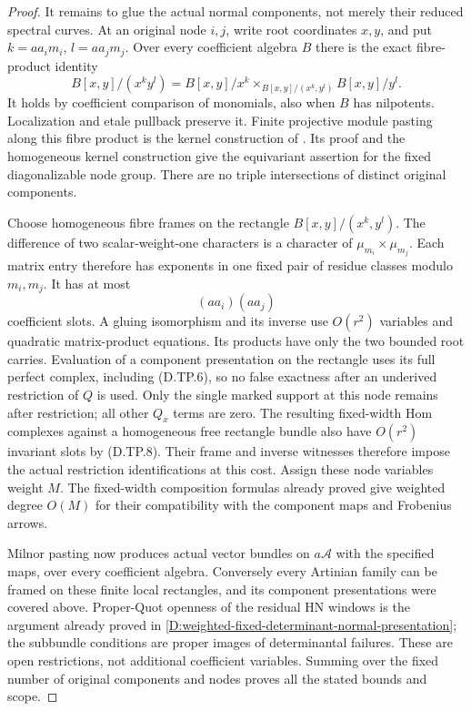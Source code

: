 \begin{proof}
It remains to glue the actual normal components,
not merely their reduced spectral curves.
At an original node $i,j$, write root coordinates
$x,y$, and put $k=aa_i m_i$, $l=aa_jm_j$.
Over every coefficient algebra $B$ there is
the exact fibre-product identity
\[
 B[x,y]/(x^ky^l)=B[x,y]/x^k
       \mathbin{\times}_{B[x,y]/(x^k,y^l)}B[x,y]/y^l.
                                                        \tag{D.TP.7}
\]
It holds by coefficient comparison of monomials,
also when $B$ has nilpotents. Localization and
etale pullback preserve it. Finite projective
module pasting along this fibre product is the
kernel construction of
\citep[Section15.6, Lemmas15.6.4--15.6.9,
especially Tag0D2J]{StacksTreePastingD}.
Its proof and the homogeneous kernel construction
give the equivariant assertion for the fixed
diagonalizable node group. There are no triple
intersections of distinct original components.

Choose homogeneous fibre frames on the rectangle
$B[x,y]/(x^k,y^l)$. The difference of two
scalar-weight-one characters is a character of
$\mu_{m_i}\times\mu_{m_j}$. Each matrix entry
therefore has exponents in one fixed pair of
residue classes modulo $m_i,m_j$. It has at most
\[
                       (aa_i)(aa_j)                  \tag{D.TP.8}
\]
coefficient slots. A gluing isomorphism and its
inverse use $O(r^2)$ variables and quadratic
matrix-product equations. Its products have
only the two bounded root carries. Evaluation
of a component presentation on the rectangle
uses its full perfect complex, including
(D.TP.6), so no false exactness after an
underived restriction of $Q$ is used.
Only the single marked support at this node
remains after restriction; all other $Q_x$
terms are zero. The resulting fixed-width
Hom complexes against a homogeneous free
rectangle bundle also have $O(r^2)$ invariant
slots by (D.TP.8). Their frame and inverse
witnesses therefore impose the actual
restriction identifications at this cost.
Assign these node variables weight $M$.
The fixed-width composition formulas already
proved give weighted degree $O(M)$ for their
compatibility with the component maps and
Frobenius arrows.

Milnor pasting now produces actual vector
bundles on $a\mathcal A$ with the specified
maps, over every coefficient algebra.
Conversely every Artinian family can be
framed on these finite local rectangles,
and its component presentations were covered
above. Proper-Quot openness of the residual
HN windows is the argument already proved
in \ref{D:weighted-fixed-determinant-normal-presentation};
the subbundle conditions are proper images
of determinantal failures. These are open
restrictions, not additional coefficient
variables. Summing over the fixed number
of original components and nodes proves
all the stated bounds and scope.
\end{proof}
